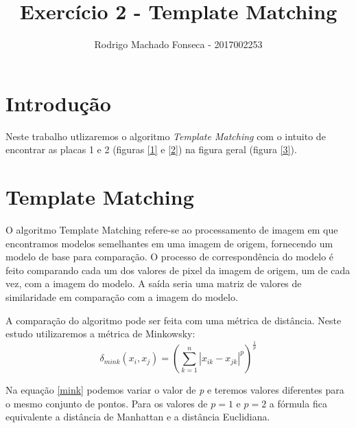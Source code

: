 \documentclass[12pt]{article}
\begin{document}

\pagestyle{fancy}
\fancyhf{}
\renewcommand{\headrulewidth}{0.4pt}
\fancyfoot[C]{\thepage}
\renewcommand{\footrulewidth}{0.4pt}
\fancyfoot[C]{\thepage}
\title{\LARGE \bf
 Exercício  2 - Template Matching}
\author{ Rodrigo Machado Fonseca - 2017002253}
\thispagestyle{fancy}
\maketitle
\thispagestyle{fancy}

\section{Introdução}
  \par Neste trabalho utlizaremos o algoritmo \textit{Template Matching} com o intuito de encontrar as placas 1 e 2 (figuras \ref{1} e \ref{2}) na figura geral (figura \ref{3}).
  
\section{Template Matching}
  \par O algoritmo Template Matching refere-se ao processamento de imagem em que encontramos modelos semelhantes em uma imagem de origem, fornecendo um modelo de base para comparação. O processo de correspondência do modelo é feito comparando cada um dos valores de pixel da imagem de origem, um de cada vez, com a imagem do modelo. A saída seria uma matriz de valores de similaridade em comparação com a imagem do modelo.
  
  \par A comparação do algoritmo pode ser feita com uma métrica de distância. Neste estudo utilizaremos a métrica de Minkowsky:
  \begin{equation}
    \delta_{mink}(x_i, x_j) = (\sum_{k=1}^n |x_{ik}-x_{jk}|^p)^{\frac{1}{p}}
    \label{mink}
  \end{equation}
  \par Na equação \ref{mink} podemos variar o valor de \textit{p} e teremos valores diferentes para o mesmo conjunto de pontos. Para os valores de $p=1$ e $p=2$ a fórmula fica equivalente a distância de Manhattan e a distância Euclidiana.
  
\end{document}
